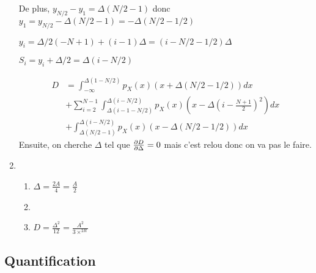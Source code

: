 \documentclass{../../td}
\begin{document}
\begin{enumerate}
De plus, $y_{N/2}-y_1 = \Delta(N/2-1)$ donc $y_1 = y_{N/2}-\Delta(N/2-1) = -\Delta(N/2-1/2)$

$y_i = \Delta/2(-N+1)+(i-1)\Delta = (i-N/2-1/2)\Delta$

$S_i=y_i+\Delta/2=\Delta(i-N/2)$

\begin{align*}
  D & = \int_{-\infty}^{\Delta(1-N/2)}p_X(x)(x+\Delta(N/2-1/2))dx\\
    &+ \sum_{i=2}^{N-1} \int_{\Delta(i-1-N/2)}^{\Delta(i-N/2)} p_X(x)(x-\Delta(i-\frac{N+1}{2})^2)dx \\
  &+ \int_{\Delta(N/2-1)}^{\Delta(i-N/2)} p_X(x)(x-\Delta(N/2-1/2))dx
\end{align*}
Ensuite, on cherche $\Delta$ tel que $\derivp[D]{\Delta}=0$ mais c'est relou donc on va pas le faire.

\item \begin{enumerate}
\item $ \Delta = \frac{2A}{4} = \frac{A}{2}$
\item %
\item $D=\frac{\Delta^2}{12}=\frac{A^2}{3\times^{2R}}$
\end{enumerate}
\end{enumerate}

\subsection{Quantification}
\end{document}
